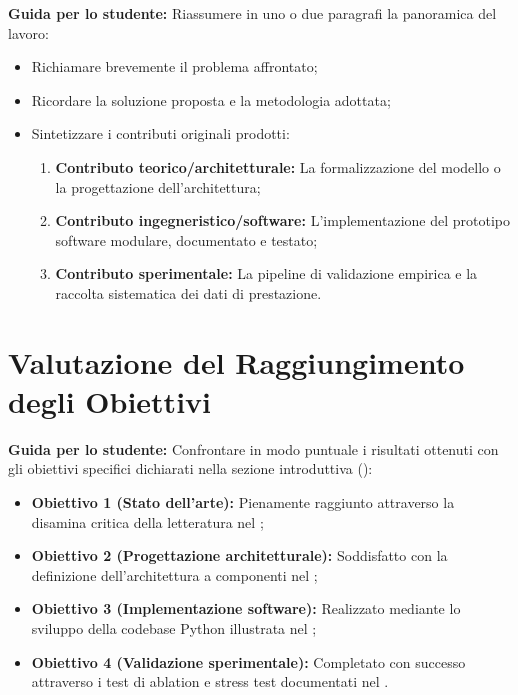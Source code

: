 \textbf{Guida per lo studente:} Riassumere in uno o due paragrafi la panoramica del lavoro:
\begin{itemize}
    \item Richiamare brevemente il problema affrontato;
    \item Ricordare la soluzione proposta e la metodologia adottata;
    \item Sintetizzare i contributi originali prodotti:
    \begin{enumerate}
        \item \textbf{Contributo teorico/architetturale:} La formalizzazione del modello o la progettazione dell'architettura;
        \item \textbf{Contributo ingegneristico/software:} L'implementazione del prototipo software modulare, documentato e testato;
        \item \textbf{Contributo sperimentale:} La pipeline di validazione empirica e la raccolta sistematica dei dati di prestazione.
    \end{enumerate}
\end{itemize}


\section{Valutazione del Raggiungimento degli Obiettivi}
\label{sec:raggiungimento-obiettivi}

\textbf{Guida per lo studente:} Confrontare in modo puntuale i risultati ottenuti con gli obiettivi specifici dichiarati nella sezione introduttiva ():

\begin{itemize}
    \item \textbf{Obiettivo 1 (Stato dell'arte):} Pienamente raggiunto attraverso la disamina critica della letteratura nel ;
    \item \textbf{Obiettivo 2 (Progettazione architetturale):} Soddisfatto con la definizione dell'architettura a componenti nel ;
    \item \textbf{Obiettivo 3 (Implementazione software):} Realizzato mediante lo sviluppo della codebase Python illustrata nel ;
    \item \textbf{Obiettivo 4 (Validazione sperimentale):} Completato con successo attraverso i test di ablation e stress test documentati nel .
\end{itemize}


